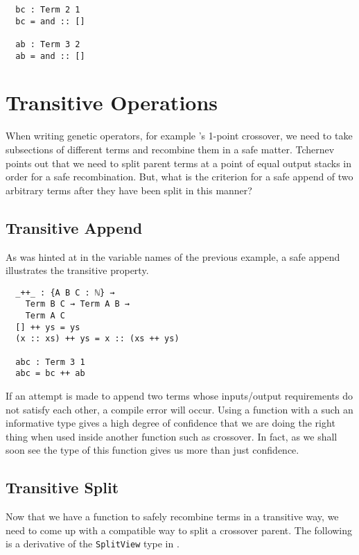 \documentclass{acm_proc_article-sp}
\begin{document}
\begin{verbatim}
  bc : Term 2 1
  bc = and :: []

  ab : Term 3 2
  ab = and :: []
\end{verbatim}

\section{Transitive Operations}

When writing genetic operators, for example
\cite{tchernev:forthcross}'s 1-point crossover, we need to take
subsections of different terms and recombine them in a safe
matter. Tchernev points out that we need to split parent terms at a
point of equal output stacks in order for a safe recombination. But,
what is the criterion for a safe append of two arbitrary terms after
they have been split in this manner?

\subsection{Transitive Append}

As was hinted at in the variable names of the previous example, a safe
append illustrates the transitive property.

\begin{verbatim}
  _++_ : {A B C : ℕ} →
    Term B C → Term A B →
    Term A C
  [] ++ ys = ys
  (x :: xs) ++ ys = x :: (xs ++ ys)

  abc : Term 3 1
  abc = bc ++ ab
\end{verbatim}

If an attempt is made to append two terms whose inputs/output
requirements do not satisfy each other, a compile error will
occur. Using a function with a such an informative type gives a high
degree of confidence that we are doing the right thing when used
inside another function such as crossover. In fact, as we shall soon
see the type of this function gives us more than just confidence.

\subsection{Transitive Split}

Now that we have a function to safely recombine terms in a transitive
way, we need to come up with a compatible way to split a crossover
parent. The following is a derivative of the \texttt{SplitView} type
in \cite{oury:tpop}.
\end{document}
